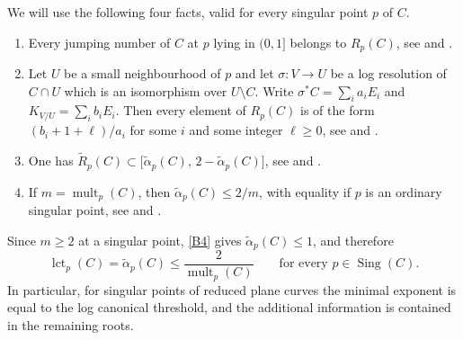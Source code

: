 \documentclass[11pt]{amsart}
\theoremstyle{definition}
\numberwithin{equation}{section}
\newcommand{\tR}{\widetilde{R}}
\newcommand{\talpha}{\widetilde{\alpha}}
\DeclareMathOperator{\Sing}{Sing}
\DeclareMathOperator{\lct}{lct}
\DeclareMathOperator{\mult}{mult}
\begin{document}
We will use the following four facts, valid for every singular point $p$ of $C$.
\begin{enumerate}[label=\textup{(B\arabic*)},leftmargin=*]
\item\label{B1} Every jumping number of $C$ at $p$ lying in $(0,1]$ belongs to $R_p(C)$, see \cite{ELSV} and \cite[Theorem~7.3]{PoBS}.
\item\label{B2} Let $U$ be a small neighbourhood of $p$ and let $\sigma\colon V\to U$ be a log resolution of $C\cap U$ which is an isomorphism over $U\setminus C$.
Write $\sigma^*C=\sum_ia_iE_i$ and $K_{V/U}=\sum_ib_iE_i$.
Then every element of $R_p(C)$ is of the form $(b_i+1+\ell)/a_i$ for some $i$ and some integer $\ell\ge0$, see \cite[Theorem~5]{Lich} and \cite[Theorem~4.4]{PoBS}.
\item\label{B3} One has $\tR_p(C)\subset\bigl[\talpha_p(C),\,2-\talpha_p(C)\bigr]$, see \cite[Theorem~0.4]{SaM} and \cite[Remark~9.11]{PoBS}.
\item\label{B4} If $m=\mult_p(C)$, then $\talpha_p(C)\le 2/m$, with equality if $p$ is an ordinary singular point, see \cite[Theorem~E]{MP} and \cite[Theorem~9.9(3) and Example~9.10]{PoBS}.
\end{enumerate}
Since $m\ge2$ at a singular point, \ref{B4} gives $\talpha_p(C)\le1$, and therefore
\begin{equation}\label{eq:lctalpha}
\lct_p(C)=\talpha_p(C)\le\frac{2}{\mult_p(C)}\qquad\text{for every }p\in\Sing(C).
\end{equation}
In particular, for singular points of reduced plane curves the minimal exponent is equal to the log canonical threshold, and the additional information is contained in the remaining roots.
\end{document}
